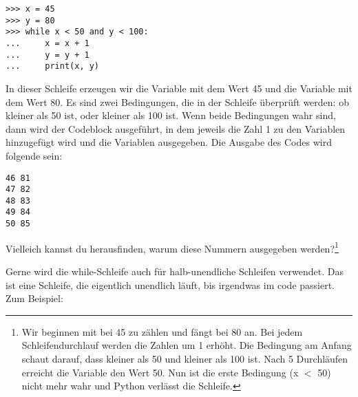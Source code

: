 \begin{Verbatim}[frame=single]
>>> x = 45
>>> y = 80
>>> while x < 50 and y < 100:
...     x = x + 1
...     y = y + 1
...     print(x, y)
\end{Verbatim}

In dieser Schleife erzeugen wir die Variable  mit dem Wert 45 und die Variable  mit dem Wert 80. Es sind zwei Bedingungen, die in der Schleife überprüft werden: ob  kleiner als 50 ist, oder  kleiner als 100 ist. Wenn beide Bedingungen wahr sind, dann wird der Codeblock ausgeführt, in dem jeweils die Zahl 1 zu den Variablen hinzugefügt wird und die Variablen ausgegeben. Die Ausgabe des Codes wird folgende sein:

\begin{Verbatim}[frame=single]
46 81
47 82
48 83
49 84
50 85
\end{Verbatim}

Vielleich kannst du herausfinden, warum diese Nummern ausgegeben werden?\footnote{Wir beginnen mit  bei 45 zu zählen und  fängt bei 80 an. Bei jedem Schleifendurchlauf werden die Zahlen um 1 erhöht. Die Bedingung am Anfang schaut darauf, dass  kleiner als 50 und  kleiner als 100 ist. Nach 5 Durchläufen erreicht die Variable  den Wert 50. Nun ist die erste Bedingung (x $<$ 50) nicht mehr wahr und Python verlässt die Schleife.}

Gerne wird die while-Schleife auch für halb-unendliche Schleifen verwendet. Das ist eine Schleife, die eigentlich unendlich läuft, bis irgendwas im code passiert. Zum Beispiel:


